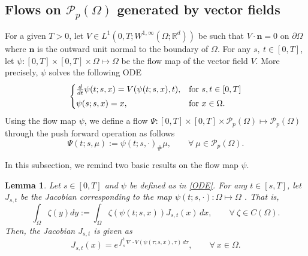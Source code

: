 \documentclass{amsart}
\newtheorem{lemma}[defn]{Lemma}
\numberwithin{equation}{section}
\begin{document}
 \subsection{Flows on $\mathcal{P}_p(\Omega)$ generated by vector fields}
For a given $T>0$, let $V\in L^1(0,T; W^{1,\infty}(\Omega;\mathbb{R}^d))$ be such that $V\cdot \mathbf{n}=0$ on $\partial \Omega$ where $\mathbf{n}$ is the outward unit normal to the
boundary of $\Omega$. For any $s, ~t\in [0,T]$, let
$\psi:[0,T]\times [0,T]\times\Omega\mapsto \Omega$ be the flow map
of the vector field $V$.
 More precisely, $\psi$ solves the following ODE
 \begin{equation}\label{ODE}
\begin{cases}
\frac{d}{dt}\psi(t;s,x)= V(\psi(t;s,x),t),  &\text{for } s, t\in[0,T] \vspace{1 mm}\\
\psi(s;s,x)=x,  &\text{for }  x\in\Omega.
\end{cases}
\end{equation}
Using the flow map $\psi$, we define a flow $\Psi: [0,T]\times [0,T]\times \mathcal{P}_p(\Omega)\mapsto \mathcal{P}_p(\Omega)$ through the push forward operation as follows
\begin{equation}\label{Flow on Wasserstein}
\Psi(t;s,\mu):={\psi}(t;s,\cdot)_\# \mu, \qquad \forall ~ \mu \in \mathcal{P}_p(\Omega).
\end{equation}

In this subsection, we remind two basic results on the flow map $\psi$.


\begin{lemma}\label{Lemma : Lipschitz of Jacobian}\cite[Lemma~3.2]{KK-SIMA}
Let $s\in [0,T]$ and $\psi$ be defined as in \eqref{ODE}. For any $t\in [s,T]$, let $J_{s,t}$ be the Jacobian corresponding to the map
 $\psi(t;s,\cdot):\Omega\mapsto \Omega$ . That is,
\begin{equation}\label{Jacobian}
\int_{\Omega} \zeta(y) dy:= \int_{\Omega} \zeta(\psi(t;s,x))
J_{s,t}(x)\,dx,\qquad \forall ~\zeta\in C(\Omega) .
\end{equation}
Then, the Jacobian  $ J_{s,t}$ is given as
\begin{equation*}\label{Jacobian - formular}
J_{s,t}(x)=e^{\int_s^t \nabla \cdot V (\psi(\tau;s,x),\tau) \,d\tau}, \qquad \forall ~ x\in \Omega.
\end{equation*}
\end{lemma}
\end{document}
